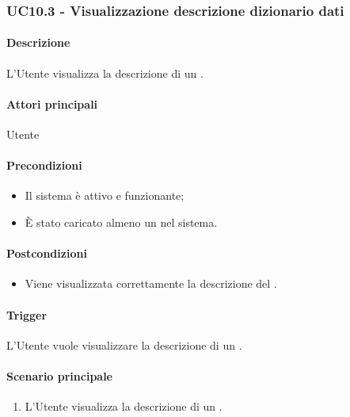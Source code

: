 
\subsubsection{UC10.3 - Visualizzazione descrizione dizionario dati}\label{UC10point3}
\paragraph*{Descrizione}
L'Utente visualizza la descrizione di un .

\paragraph*{Attori principali}
Utente

\paragraph*{Precondizioni}
\begin{itemize}
  \item Il sistema è attivo e funzionante;
  \item È stato caricato almeno un  nel sistema. 
\end{itemize}

\paragraph*{Postcondizioni}
\begin{itemize}
  \item Viene visualizzata correttamente la descrizione del .
\end{itemize}

\paragraph*{Trigger}
L'Utente vuole visualizzare la descrizione di un .

\paragraph*{Scenario principale}
\begin{enumerate}
  \item L'Utente visualizza la descrizione di un .
\end{enumerate}


